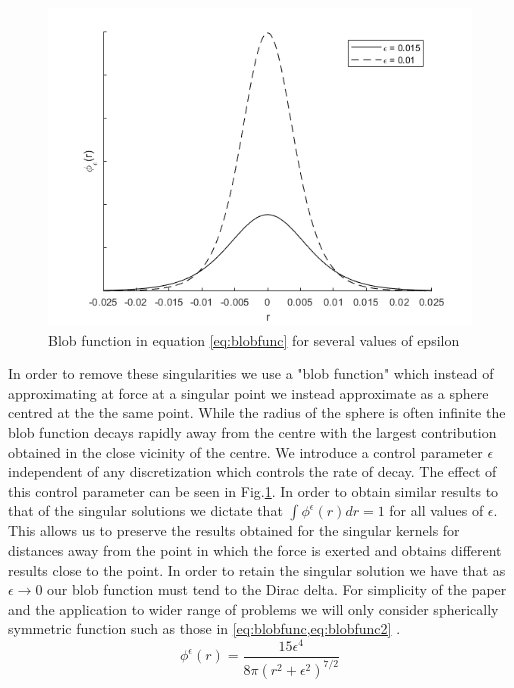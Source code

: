 \begin{figure}
    \centering
    \includegraphics[scale=0.65]{Images/BlobFunction.png}
    \caption{Blob function in equation \cref{eq:blobfunc} for several values of epsilon}
    \label{fig:blobfunc}
\end{figure}

In order to remove these singularities we use a "blob function" which instead of approximating at force at a singular point we instead approximate as a sphere centred at the the same point. While the radius of the sphere is often infinite the blob function decays rapidly away from the centre with the largest contribution obtained in the close vicinity of the centre. We introduce a control parameter $\epsilon$ independent of any discretization which controls the rate of decay. The effect of this control parameter can be seen in Fig.\cref{fig:blobfunc}. In order to obtain similar results to that of the singular solutions we dictate that $\int \phi^\epsilon(r)dr=1$ for all values of $\epsilon$. This allows us to preserve the results obtained for the singular kernels for distances away from the point in which the force is exerted and obtains different results close to the point. In order to retain the singular solution we have that as $\epsilon \to 0$ our blob function must tend to the Dirac delta. For simplicity of the paper and the application to wider range of problems we will only consider spherically symmetric function such as those in \cref{eq:blobfunc,eq:blobfunc2} \cite{Cortez2005,Olson2013ModelingFormulation,Nguyen2014ReductionFlow}.
\begin{equation}
\label{eq:blobfunc}
    \phi^\epsilon(r)= \frac{15 \epsilon^4}{8\pi\left( r^2 +\epsilon^2 \right)^{7/2}}
\end{equation}

